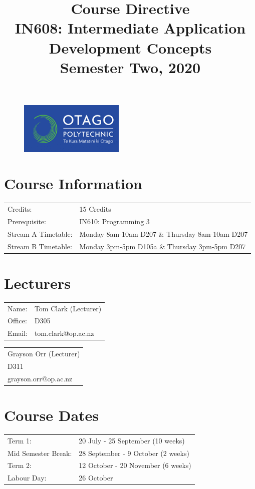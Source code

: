 \documentclass{article}
\author{}
\begin{document}
\begin{figure}
	\includegraphics[width=50mm]{./img/logo.png}
\end{figure}

\title{Course Directive\\IN608: Intermediate Application Development Concepts\\Semester Two, 2020}
\date{}
\maketitle

\section*{Course Information}
\begin{tabular}{ll}
	Credits:            & 15 Credits                                     \\
	Prerequisite:       & IN610: Programming 3                           \\
	Stream A Timetable: & Monday 8am-10am D207 \& Thursday 8am-10am D207 \\
	Stream B Timetable: & Monday 3pm-5pm D105a \& Thursday 3pm-5pm D207  
\end{tabular} 

\section*{Lecturers}
\begin{tabular}{ll}
	Name:   & Tom Clark (Lecturer) \\
	Office: & D305                 \\
	Email:  & tom.clark@op.ac.nz   \\
\end{tabular}
\begin{tabular}{l}
	Grayson Orr (Lecturer) \\
	D311                   \\
	grayson.orr@op.ac.nz   \\
\end{tabular}

\section*{Course Dates}
\begin{tabular}{ll}
	Term 1:             & 20 July - 25 September (10 weeks)  \\
	Mid Semester Break: & 28 September - 9 October (2 weeks) \\
	Term 2:             & 12 October - 20 November (6 weeks) \\
	Labour Day:         & 26 October                         
\end{tabular}
\end{document}
